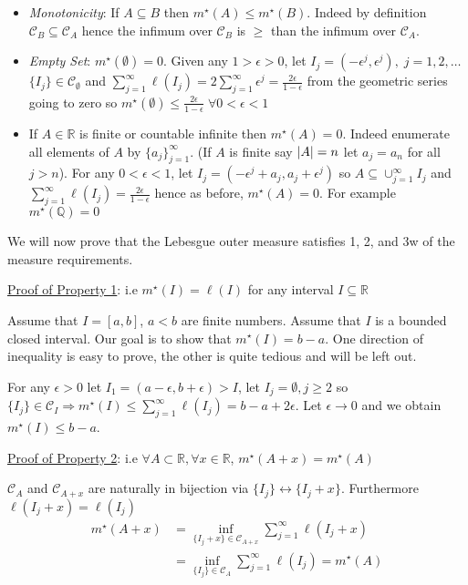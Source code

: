 \documentclass[11pt]{article}
\DeclarePairedDelimiter{\card}{\lvert}{\rvert}
\newcommand{\mstar}[1]{m^{\star}\left(#1\right)}
\newcommand{\isum}[1]{\sum_{#1=1}^{\infty}}
\begin{document}
    \begin{itemize}
        \item \emph{Monotonicity}:
        If $A \subseteq B$ then $m^{\star}(A) \leq m^{\star}(B)$.
        Indeed by definition $\mathcal{C}_B \subseteq \mathcal{C}_A$ hence the infimum over $\mathcal{C}_B$ is $\geq$ than the infimum over $\mathcal{C}_A$.
        \item \emph{Empty Set}: $\mstar{\emptyset} = 0$.
        Given any $1 > \epsilon > 0$, let $I_j = (-\epsilon^{j}, \epsilon^j), \; j=1,2,\hdots$
        $\{I_j\} \in \mathcal{C}_{\emptyset}$ and $\sum_{j=1}^{\infty} \ell (I_j) = 2 \sum_{j=1}^{\infty} \epsilon^j = \frac{2\epsilon}{1-\epsilon} $ from the geometric series going to zero so $\mstar{\emptyset} \leq \frac{2\epsilon}{1-\epsilon} \; \forall 0 < \epsilon < 1$
        \item If $A \in \mathbb{R}$ is finite or countable infinite then $\mstar{A} = 0$.
        Indeed enumerate all elements of $A$ by $\{ a_j \}_{j=1}^{\infty}$.
        (If $A$ is finite say $\card{A} = n$ let $a_j = a_n$ for all $j > n$).
        For any $0 < \epsilon < 1$, let $I_j = \left( -\epsilon^j + a_j, a_j + \epsilon^j \right)$ so $A \subseteq \cup_{j=1}^{\infty} I_j$ and $\isum{j} \ell (I_j) = \frac{2\epsilon}{1-\epsilon}$ hence as before, $\mstar{A} = 0$.
        For example $\mstar{\mathbb{Q}} = 0$
    \end{itemize}

    We will now prove that the Lebesgue outer measure satisfies 1, 2, and 3w of the measure requirements.

    \underline{Proof of Property 1}:
    i.e $\mstar{I} = \ell(I)$ for any interval $I \subseteq \mathbb{R}$

    Assume that $I = [a,b]$, $a < b$ are finite numbers.
    Assume that $I$ is a bounded closed interval.
    Our goal is to show that $\mstar{I} = b -a$.
    One direction of inequality is easy to prove, the other is quite tedious and will be left out.

    For any $\epsilon > 0$ let $I_1 = (a-\epsilon, b + \epsilon) > I$, let $I_j = \emptyset, j \geq 2$ so $\{I_j \} \in \mathcal{C}_I \Rightarrow \mstar{I} \leq \isum{j} \ell (I_j) = b - a + 2 \epsilon$.
    Let $\epsilon \rightarrow 0$ and we obtain $\mstar{I} \leq b-a$.

    \underline{Proof of Property 2}:
    i.e $\forall A \subset \mathbb{R}, \forall x \in \mathbb{R}$, $\mstar{A+x} = \mstar{A}$

    $\mathcal{C}_A$ and $\mathcal{C}_{A+x}$ are naturally in bijection via $\{ I_j \} \leftrightarrow \{ I_j + x \}$.
    Furthermore $\ell (I_j + x) = \ell (I_j)$
    \begin{align*}
        \mstar{A+x} &= \inf_{\{I_j +x\} \in \mathcal{C}_{A+x}} \isum{j} \ell (I_j + x) \\
        &= \inf_{\{I_j\} \in \mathcal{C}_{A}} \isum{j} \ell (I_j) = \mstar{A}
    \end{align*}
\end{document}
